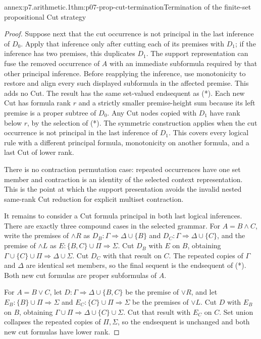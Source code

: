 \begin{annexitem}{annex:p7.arithmetic.1}{thm:p07-prop-cut-termination}{Termination of the finite-set propositional Cut strategy}
\begin{proof}
Suppose next that the cut occurrence is not principal in the last inference
of \(D_0\).  Apply that inference only after cutting each of its premises with
\(D_1\); if the inference has two premises, this duplicates \(D_1\).  The
support representation can fuse the removed occurrence of \(A\) with an
immediate subformula required by that other principal inference.  Before
reapplying the inference, use monotonicity to restore and align every such
displayed subformula in the affected premise.  This adds no Cut.  The result
has the same set-valued endsequent as (*).  Each new Cut
has formula rank \(r\) and a strictly smaller premise-height sum because its
left premise is a proper subtree of \(D_0\).  Any Cut nodes copied with \(D_1\)
have rank below \(r\), by the selection of (*).  The symmetric construction
applies when the cut occurrence is not principal in the last inference of
\(D_1\).  This covers every logical rule with a different principal formula,
monotonicity on another formula, and a last Cut of lower rank.

There is no contraction permutation case: repeated occurrences have one set
member and contraction is an identity of the selected context representation.
This is the point at which the support presentation avoids the invalid nested
same-rank Cut reduction for explicit multiset contraction.

It remains to consider a Cut formula principal in both last logical
inferences.  There are exactly three compound cases in the selected grammar.
For \(A=B\land C\), write the premises of \(\land R\) as
\(D_B:\Gamma\Rightarrow\Delta\cup\{B\}\) and
\(D_C:\Gamma\Rightarrow\Delta\cup\{C\}\), and the premise of \(\land L\) as
\(E:\{B,C\}\cup\Pi\Rightarrow\Sigma\).  Cut \(D_B\) with \(E\) on \(B\),
obtaining
\(\Gamma\cup\{C\}\cup\Pi\Rightarrow\Delta\cup\Sigma\).  Cut \(D_C\) with
that result on \(C\).  The repeated copies of \(\Gamma\) and \(\Delta\) are
identical set members, so the final sequent is the endsequent of (*).  Both new
cut formulas are proper subformulas of \(A\).

For \(A=B\lor C\), let
\(D:\Gamma\Rightarrow\Delta\cup\{B,C\}\) be the premise of \(\lor R\), and
let \(E_B:\{B\}\cup\Pi\Rightarrow\Sigma\) and
\(E_C:\{C\}\cup\Pi\Rightarrow\Sigma\) be the premises of \(\lor L\).
Cut \(D\) with \(E_B\) on \(B\), obtaining
\(\Gamma\cup\Pi\Rightarrow\Delta\cup\{C\}\cup\Sigma\).  Cut that result
with \(E_C\) on \(C\).  Set union collapses the repeated copies of
\(\Pi,\Sigma\), so the endsequent is unchanged and both new cut formulas have
lower rank.


\end{proof}
\end{annexitem}
